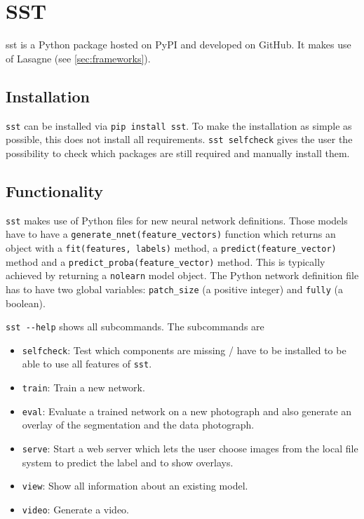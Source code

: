 
\section{SST}\label{sec:sst}
\Gls{sst} is a Python package hosted on \gls{PyPI} and developed on GitHub. It
makes use of Lasagne (see \cref{sec:frameworks}).

\subsection{Installation}
\verb+sst+ can be installed via \verb+pip install sst+. To make the
installation as simple as possible, this does not install all requirements.
\verb+sst selfcheck+ gives the user the possibility to check which packages
are still required and manually install them.

\subsection{Functionality}
\verb+sst+ makes use of Python files for new neural network definitions. Those
models have to have a \verb+generate_nnet(feature_vectors)+ function which
returns an object with a \verb+fit(features, labels)+ method, a
\verb+predict(feature_vector)+ method and a
\verb+predict_proba(feature_vector)+ method. This is typically achieved by
returning a \verb+nolearn+ model object. The Python network definition file
has to have two global variables: \verb+patch_size+ (a positive integer) and
\verb+fully+ (a boolean).

\verb+sst --help+ shows all subcommands. The subcommands are

\begin{itemize}
    \item \verb+selfcheck+: Test which components are missing / have to be
          installed to be able to use all features of \verb+sst+.
    \item \verb+train+: Train a new network.
    \item \verb+eval+: Evaluate a trained network on a new photograph and also
          generate an overlay of the segmentation and the data photograph.
    \item \verb+serve+: Start a web server which lets the user choose images
          from the local file system to predict the label and to show overlays.
    \item \verb+view+: Show all information about an existing model.
    \item \verb+video+: Generate a video.
\end{itemize}